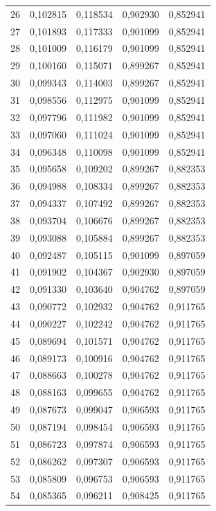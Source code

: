 \begin{tabular}{lrrrr}
26 & 0,102815 & 0,118534 & 0,902930 & 0,852941 \\
27 & 0,101893 & 0,117333 & 0,901099 & 0,852941 \\
28 & 0,101009 & 0,116179 & 0,901099 & 0,852941 \\
29 & 0,100160 & 0,115071 & 0,899267 & 0,852941 \\
30 & 0,099343 & 0,114003 & 0,899267 & 0,852941 \\
31 & 0,098556 & 0,112975 & 0,901099 & 0,852941 \\
32 & 0,097796 & 0,111982 & 0,901099 & 0,852941 \\
33 & 0,097060 & 0,111024 & 0,901099 & 0,852941 \\
34 & 0,096348 & 0,110098 & 0,901099 & 0,852941 \\
35 & 0,095658 & 0,109202 & 0,899267 & 0,882353 \\
36 & 0,094988 & 0,108334 & 0,899267 & 0,882353 \\
37 & 0,094337 & 0,107492 & 0,899267 & 0,882353 \\
38 & 0,093704 & 0,106676 & 0,899267 & 0,882353 \\
39 & 0,093088 & 0,105884 & 0,899267 & 0,882353 \\
40 & 0,092487 & 0,105115 & 0,901099 & 0,897059 \\
41 & 0,091902 & 0,104367 & 0,902930 & 0,897059 \\
42 & 0,091330 & 0,103640 & 0,904762 & 0,897059 \\
43 & 0,090772 & 0,102932 & 0,904762 & 0,911765 \\
44 & 0,090227 & 0,102242 & 0,904762 & 0,911765 \\
45 & 0,089694 & 0,101571 & 0,904762 & 0,911765 \\
46 & 0,089173 & 0,100916 & 0,904762 & 0,911765 \\
47 & 0,088663 & 0,100278 & 0,904762 & 0,911765 \\
48 & 0,088163 & 0,099655 & 0,904762 & 0,911765 \\
49 & 0,087673 & 0,099047 & 0,906593 & 0,911765 \\
50 & 0,087194 & 0,098454 & 0,906593 & 0,911765 \\
51 & 0,086723 & 0,097874 & 0,906593 & 0,911765 \\
52 & 0,086262 & 0,097307 & 0,906593 & 0,911765 \\
53 & 0,085809 & 0,096753 & 0,906593 & 0,911765 \\
54 & 0,085365 & 0,096211 & 0,908425 & 0,911765 \\

\end{tabular}
